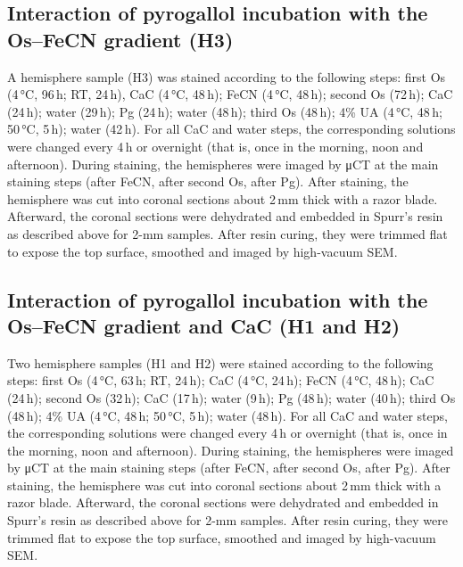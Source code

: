 \documentclass{article}
\begin{document}
\subsection*{Interaction of pyrogallol incubation with the Os–FeCN gradient (H3)}
A hemisphere sample (H3) was stained according to the following steps: first Os (4\,°C, 96\,h; RT, 24\,h), CaC (4\,°C, 48\,h); FeCN (4\,°C, 48\,h); second Os (72\,h); CaC (24\,h); water (29\,h); Pg (24\,h); water (48\,h); third Os (48\,h); 4\% UA (4\,°C, 48\,h; 50\,°C, 5\,h); water (42\,h). For all CaC and water steps, the corresponding solutions were changed every 4\,h or overnight (that is, once in the morning, noon and afternoon). During staining, the hemispheres were imaged by μCT at the main staining steps (after FeCN, after second Os, after Pg). After staining, the hemisphere was cut into coronal sections about 2\,mm thick with a razor blade. Afterward, the coronal sections were dehydrated and embedded in Spurr’s resin as described above for 2-mm samples. After resin curing, they were trimmed flat to expose the top surface, smoothed and imaged by high-vacuum SEM.

\subsection*{Interaction of pyrogallol incubation with the Os–FeCN gradient and CaC (H1 and H2)}
Two hemisphere samples (H1 and H2) were stained according to the following steps: first Os (4\,°C, 63\,h; RT, 24\,h); CaC (4\,°C, 24\,h); FeCN (4\,°C, 48\,h); CaC (24\,h); second Os (32\,h); CaC (17\,h); water (9\,h); Pg (48\,h); water (40\,h); third Os (48\,h); 4\% UA (4\,°C, 48\,h; 50\,°C, 5\,h); water (48\,h). For all CaC and water steps, the corresponding solutions were changed every 4\,h or overnight (that is, once in the morning, noon and afternoon). During staining, the hemispheres were imaged by μCT at the main staining steps (after FeCN, after second Os, after Pg). After staining, the hemisphere was cut into coronal sections about 2\,mm thick with a razor blade. Afterward, the coronal sections were dehydrated and embedded in Spurr’s resin as described above for 2-mm samples. After resin curing, they were trimmed flat to expose the top surface, smoothed and imaged by high-vacuum SEM.
\end{document}

